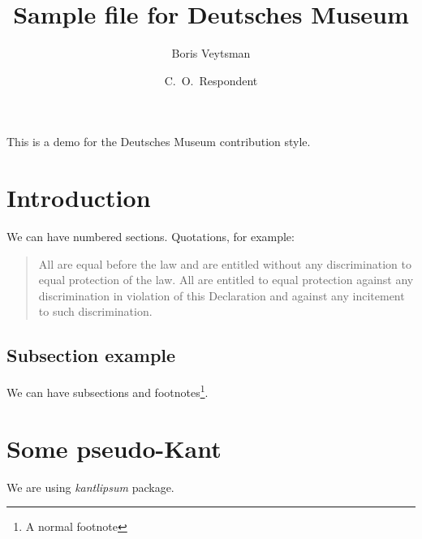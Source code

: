 \documentclass[nocfonts]{deutschesmuseum}
\begin{document}
\title{Sample file for Deutsches Museum}
\author{Boris Veytsman \and C.~O.~Respondent}
\maketitle

This is a demo for the Deutsches Museum contribution style.

\section{Introduction}
\label{sec:intro}

We can have numbered sections.  Quotations, for
example\cite[][Article~7]{UNDeclaration}: 
\begin{quote}
  All are equal before the law and are entitled without any
  discrimination to equal protection of the law. All are entitled to
  equal protection against any discrimination in violation of this
  Declaration and against any incitement to such discrimination. 
\end{quote}

\subsection{Subsection example}
\label{sec:subsection}

We can have subsections and footnotes\footnote{A normal footnote}.


\section{Some pseudo-Kant}
\label{sec:kant}

We are using \textsl{kantlipsum} package\cite{kantlipsum}. 

\kant

\clearpage



\end{document}
